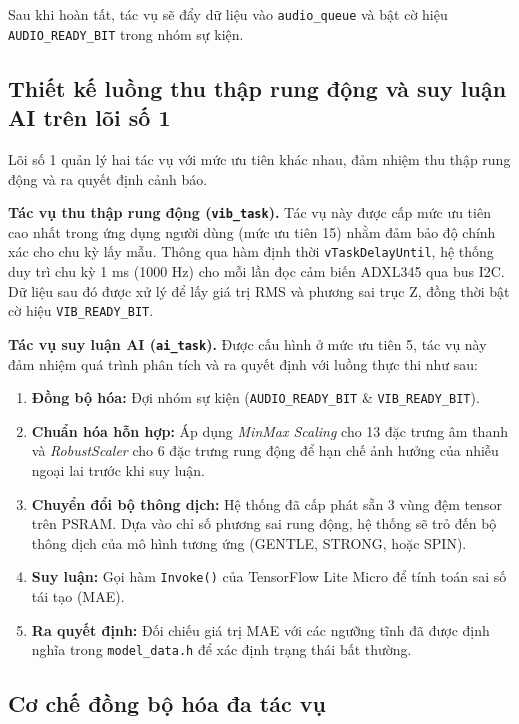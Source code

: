 Sau khi hoàn tất, tác vụ sẽ đẩy dữ liệu vào \texttt{audio\_queue} và bật cờ hiệu \texttt{AUDIO\_READY\_BIT} trong nhóm sự kiện.

\subsection{Thiết kế luồng thu thập rung động và suy luận AI trên lõi số 1}

Lõi số 1 quản lý hai tác vụ với mức ưu tiên khác nhau, đảm nhiệm thu thập rung động và ra quyết định cảnh báo.

\textbf{Tác vụ thu thập rung động (\texttt{vib\_task}).} Tác vụ này được cấp mức ưu tiên cao nhất trong ứng dụng người dùng (mức ưu tiên 15) nhằm đảm bảo độ chính xác cho chu kỳ lấy mẫu. Thông qua hàm định thời \texttt{vTaskDelayUntil}, hệ thống duy trì chu kỳ 1 ms (1000 Hz) cho mỗi lần đọc cảm biến ADXL345 qua bus I2C. Dữ liệu sau đó được xử lý để lấy giá trị RMS và phương sai trục Z, đồng thời bật cờ hiệu \texttt{VIB\_READY\_BIT}.

\textbf{Tác vụ suy luận AI (\texttt{ai\_task}).} Được cấu hình ở mức ưu tiên 5, tác vụ này đảm nhiệm quá trình phân tích và ra quyết định với luồng thực thi như sau:
\begin{enumerate}
    \item \textbf{Đồng bộ hóa:} Đợi nhóm sự kiện (\texttt{AUDIO\_READY\_BIT} \& \texttt{VIB\_READY\_BIT}).
    \item \textbf{Chuẩn hóa hỗn hợp:} Áp dụng \textit{MinMax Scaling} cho 13 đặc trưng âm thanh và \textit{RobustScaler} cho 6 đặc trưng rung động để hạn chế ảnh hưởng của nhiễu ngoại lai trước khi suy luận.
    \item \textbf{Chuyển đổi bộ thông dịch:} Hệ thống đã cấp phát sẵn 3 vùng đệm tensor trên PSRAM. Dựa vào chỉ số phương sai rung động, hệ thống sẽ trỏ đến bộ thông dịch của mô hình tương ứng (GENTLE, STRONG, hoặc SPIN).
    \item \textbf{Suy luận:} Gọi hàm \texttt{Invoke()} của TensorFlow Lite Micro để tính toán sai số tái tạo (MAE).
    \item \textbf{Ra quyết định:} Đối chiếu giá trị MAE với các ngưỡng tĩnh đã được định nghĩa trong \texttt{model\_data.h} để xác định trạng thái bất thường.
\end{enumerate}

\subsection{Cơ chế đồng bộ hóa đa tác vụ}

